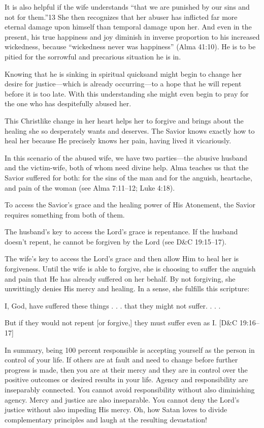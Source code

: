 \documentclass[letterpaper, 11pt]{report}
\newcommand{\intalkheader}[1]{
    \vspace{0.75em}
    \noindent{\normalsize\bfseries #1}
    \par\nopagebreak %
    \vspace{0.25em}
    \nopagebreak     %
}
\begin{document}
It is also helpful if the wife understands “that we are punished by our sins and not for them.”13 She then recognizes that her abuser has inflicted far more eternal damage upon himself than temporal damage upon her. And even in the present, his true happiness and joy diminish in inverse proportion to his increased wickedness, because “wickedness never was happiness” (Alma 41:10). He is to be pitied for the sorrowful and precarious situation he is in.

Knowing that he is sinking in spiritual quicksand might begin to change her desire for ­justice—which is already occurring—to a hope that he will repent before it is too late. With this understanding she might even begin to pray for the one who has despitefully abused her.

This Christlike change in her heart helps her to forgive and brings about the healing she so desperately wants and deserves. The Savior knows exactly how to heal her because He precisely knows her pain, having lived it vicariously.

In this scenario of the abused wife, we have two parties—the abusive husband and the ­victim-wife, both of whom need divine help. Alma teaches us that the Savior suffered for both: for the sins of the man and for the anguish, heartache, and pain of the woman (see Alma 7:11–12; Luke 4:18).

To access the Savior’s grace and the healing power of His Atonement, the Savior requires something from both of them.

The husband’s key to access the Lord’s grace is repentance. If the husband doesn’t repent, he cannot be forgiven by the Lord (see D\&C 19:15–17).

The wife’s key to access the Lord’s grace and then allow Him to heal her is forgiveness. Until the wife is able to forgive, she is choosing to suffer the anguish and pain that He has already suffered on her behalf. By not forgiving, she unwittingly denies His mercy and healing. In a sense, she fulfills this scripture:

I, God, have suffered these things . . . that they might not suffer. . . .

But if they would not repent [or forgive,] they must suffer even as I. [D\&C 19:16–17]

\intalkheader{Conclusion}
In summary, being 100 percent responsible is accepting yourself as the person in control of your life. If others are at fault and need to change before further progress is made, then you are at their mercy and they are in control over the positive outcomes or desired results in your life. Agency and responsibility are inseparably connected. You cannot avoid responsibility without also diminishing agency. Mercy and justice are also inseparable. You cannot deny the Lord’s justice without also impeding His mercy. Oh, how Satan loves to divide complementary principles and laugh at the resulting devastation!
\end{document}

